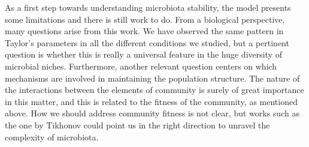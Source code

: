 As a first step towards understanding microbiota stability, the model presents some limitations and there is still work to do. From a biological perspective, many questions arise from this work. We have observed the same pattern in Taylor's parameters in all the different conditions we studied, but a pertinent question is whether this is really a universal feature in the huge diversity of microbial niches. Furthermore, another relevant question centers on which mechanisms are involved in maintaining the population structure. The nature of the interactions between the elements of community is surely of great importance in this matter, and this is related to the fitness of the community, as mentioned above. How we should address community fitness is not clear, but works such as the one by Tikhonov \cite{tikhonov} could point us in the right direction to unravel the complexity of microbiota.